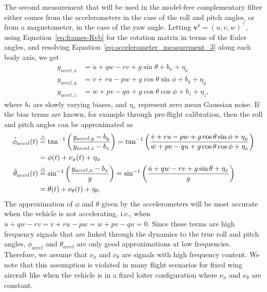 The second measurement that will be used in the model-free complementary filter either comes from the accelerometers in the case of the roll and pitch angles, or from a magnetometer, in the case of the yaw angle. Letting $\mathbf{v}^b = (u, v, w)^\top$, using Equation~\eqref{eq:frames-Rvb} for the rotation matrix in terms of the Euler angles, and resolving Equation~\eqref{eq:accelerometer_measurement_3} along each body axis, we get
\begin{align*}
y_{accel,x} &= \dot{u} + qw - rv + g\sin\theta + b_x + \eta_x \\
y_{accel,y} &= \dot{v} + ru - pw + g\cos\theta\sin\phi + b_y + \eta_y \\
y_{accel,z} &= \dot{w} + pv - qu + g\cos\theta\cos\phi + b_z + \eta_z,
\end{align*}
where $b_\ast$ are slowly varying biases, and $\eta_\ast$ represent zero mean Gaussian noise.  If the bias terms are known, for example through pre-flight calibration, then the roll and pitch angles can be approximated as
\begin{align*}
\hat{\phi}_{accel}(t) &\stackrel{\triangle}{=} \tan^{-1}\left(\frac{y_{accel,y}-b_y}{y_{accel,z}-b_z}\right) 
	= \tan^{-1}\left(\frac{\dot{v}+ru-pw+g\cos\theta\sin\phi+\eta_y}{\dot{w}+pv-qu+g\cos\theta\cos\phi+\eta_z}\right) \\
	&= \phi(t) + \nu_\phi(t) + \eta_\phi \\
\hat{\theta}_{accel}(t) &\stackrel{\triangle}{=} \sin^{-1}\left(\frac{y_{accel,x}-b_x}{g}\right) = \sin^{-1}\left(\frac{\dot{u}+qw-rv+g\sin\theta+\eta_x}{g}\right) \\
	&= \theta(t) + \nu_\theta(t) + \eta_\theta.
\end{align*}
The approximation of $\phi$ and $\theta$ given by the accelerometers will be most accurate when the vehicle is not accelerating, i.e., when $\dot{u}+qw-rv=\dot{v}+ru-pw=\dot{w}+pv-qu=0$.  Since these terms are high frequency signals that are linked through the dynamics to the true roll and pitch angles,  $\phi_{accel}$ and $\theta_{accel}$ are only good approximations at low frequencies.  Therefore, we assume that $\nu_\phi$ and $\nu_\theta$ are signals with high frequency content.  We note that this assumption is violated in many flight scenarios for fixed wing aircraft like when the vehicle is in a fixed loiter configuration where $\nu_\phi$ and $\nu_\theta$ are constant.    

